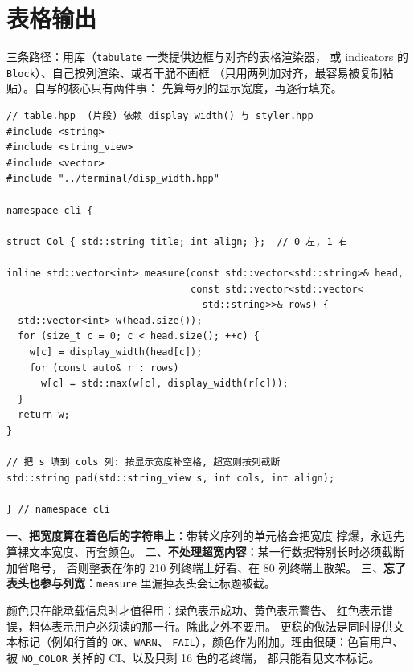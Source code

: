 \documentclass[12pt,a4paper,fontset=fandol]{ctexbook}
\newcommand{\Tp}[1]{\texttt{#1}}
\begin{document}
\section{表格输出}

三条路径：用库（\Tp{tabulate} 一类提供边框与对齐的表格渲染器，
或 indicators 的 \Tp{Block}）、自己按列渲染、或者干脆不画框
（只用两列加对齐，最容易被复制粘贴）。自写的核心只有两件事：
先算每列的显示宽度，再逐行填充。

\begin{lstlisting}[caption={手写表格渲染：列宽来自 display\_width}]
// table.hpp  (片段) 依赖 display_width() 与 styler.hpp
#include <string>
#include <string_view>
#include <vector>
#include "../terminal/disp_width.hpp"

namespace cli {

struct Col { std::string title; int align; };  // 0 左, 1 右

inline std::vector<int> measure(const std::vector<std::string>& head,
                                const std::vector<std::vector<
                                  std::string>>& rows) {
  std::vector<int> w(head.size());
  for (size_t c = 0; c < head.size(); ++c) {
    w[c] = display_width(head[c]);
    for (const auto& r : rows)
      w[c] = std::max(w[c], display_width(r[c]));
  }
  return w;
}

// 把 s 填到 cols 列: 按显示宽度补空格, 超宽则按列截断
std::string pad(std::string_view s, int cols, int align);

} // namespace cli
\end{lstlisting}

\begin{warning}[title={表格最常见的三个错误}]
一、\textbf{把宽度算在着色后的字符串上}：带转义序列的单元格会把宽度
撑爆，永远先算裸文本宽度、再套颜色。
二、\textbf{不处理超宽内容}：某一行数据特别长时必须截断加省略号，
否则整表在你的 210 列终端上好看、在 80 列终端上散架。
三、\textbf{忘了表头也参与列宽}：\Tp{measure} 里漏掉表头会让标题被截。
\end{warning}

\begin{guideline}[title={样式的语义优先于观感}]
颜色只在能承载信息时才值得用：绿色表示成功、黄色表示警告、
红色表示错误，粗体表示用户必须读的那一行。除此之外不要用。
更稳的做法是同时提供文本标记（例如行首的 \Tp{OK}、\Tp{WARN}、
\Tp{FAIL}），颜色作为附加。理由很硬：色盲用户、
被 \Tp{NO\_COLOR} 关掉的 CI、以及只剩 16 色的老终端，
都只能看见文本标记。
\end{guideline}
\end{document}
